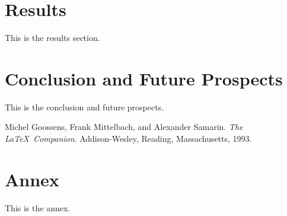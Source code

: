 \documentclass[12pt]{report}
\begin{document}
\newpage
\chapter{Results}
% 
This is the results section.

\newpage
\chapter{Conclusion and Future Prospects}
% 
This is the conclusion and future prospects.

\newpage
{}
\begin{thebibliography}{9}
Michel Goossens, Frank Mittelbach, and Alexander Samarin. 
\textit{The \LaTeX\ Companion}. 
Addison-Wesley, Reading, Massachusetts, 1993.
\end{thebibliography}
% 
\newpage
\chapter{Annex}
% 
This is the annex.
\end{document}
